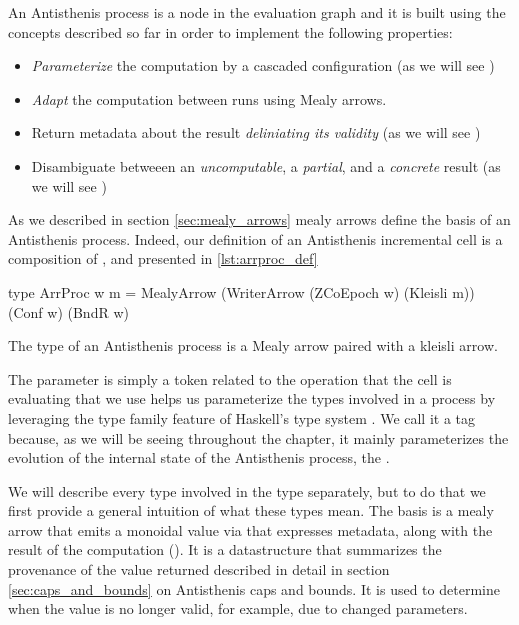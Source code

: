 An Antisthenis process is a node in the evaluation graph and it is
built using the concepts described so far in order to implement the
following properties:

\begin{itemize}
\item \emph{Parameterize} the computation by a cascaded configuration
  (as we will see )
\item \emph{Adapt} the computation between runs using Mealy arrows.
\item Return metadata about the result \emph{deliniating its validity}
  (as we will see )
\item Disambiguate betweeen an \emph{uncomputable}, a \emph{partial},
  and a \emph{concrete} result (as we will see )
\end{itemize}

As we described in section \ref{sec:mealy_arrows} mealy arrows define
the basis of an Antisthenis process. Indeed, our definition of an
Antisthenis incremental cell is a composition of ,
 and  presented in
\ref{lst:arrproc_def}

\begin{code}
\begin{haskellcode}
type ArrProc w m =
  MealyArrow (WriterArrow (ZCoEpoch w) (Kleisli m))
  (Conf w) (BndR w)
\end{haskellcode}
\caption{\label{lst:arrproc_def}The type of an Antisthenis process is a Mealy arrow paired
  with a kleisli arrow.}
\end{code}

The  parameter is simply a token related to the operation that
the cell is evaluating that we use helps us parameterize the types
involved in a process by leveraging the type family feature of
Haskell's type system \cite{AssociatedTypeSynonyms}. We call it a
 tag because, as we will be seeing throughout the
chapter, it mainly parameterizes the evolution of the internal state
of the Antisthenis process, the .

We will describe every type involved in the  type
separately, but to do that we first provide a general intuition of
what these types mean. The basis is a mealy arrow that emits a
monoidal value  via  that expresses
metadata, along with the result of the computation ().
It is a datastructure that summarizes the provenance of the value
returned described in detail in section \ref{sec:caps_and_bounds} on
Antisthenis caps and bounds. It is used to determine when the value is
no longer valid, for example, due to changed parameters.

